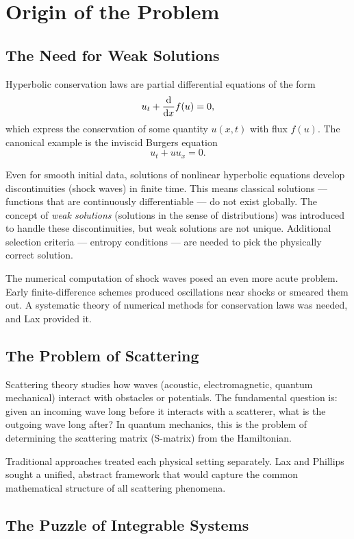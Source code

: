 \section{Origin of the Problem}

\subsection{The Need for Weak Solutions}

Hyperbolic conservation laws are partial differential equations of the form
\[
u_t + \dv{}{x} f(u) = 0,
\]
which express the conservation of some quantity \(u(x,t)\) with flux \(f(u)\). The canonical example is the inviscid Burgers equation
\[
u_t + u u_x = 0.
\]

Even for smooth initial data, solutions of nonlinear hyperbolic equations develop discontinuities (shock waves) in finite time. This means classical solutions --- functions that are continuously differentiable --- do not exist globally. The concept of \textit{weak solutions} (solutions in the sense of distributions) was introduced to handle these discontinuities, but weak solutions are not unique. Additional selection criteria --- entropy conditions --- are needed to pick the physically correct solution.

The numerical computation of shock waves posed an even more acute problem. Early finite-difference schemes produced oscillations near shocks or smeared them out. A systematic theory of numerical methods for conservation laws was needed, and Lax provided it.

\subsection{The Problem of Scattering}

Scattering theory studies how waves (acoustic, electromagnetic, quantum mechanical) interact with obstacles or potentials. The fundamental question is: given an incoming wave long before it interacts with a scatterer, what is the outgoing wave long after? In quantum mechanics, this is the problem of determining the scattering matrix (S-matrix) from the Hamiltonian.

Traditional approaches treated each physical setting separately. Lax and Phillips sought a unified, abstract framework that would capture the common mathematical structure of all scattering phenomena.

\subsection{The Puzzle of Integrable Systems}

